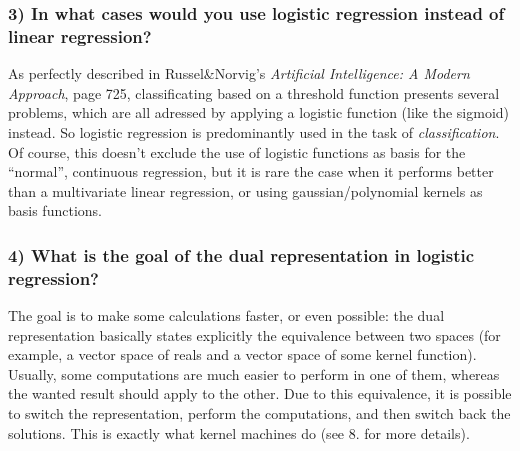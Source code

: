 \documentclass[11pt]{scrartcl} %
\begin{document}
         \subsubsection*{3) In what cases would you use logistic regression instead of linear regression?}
         As perfectly described in Russel\&Norvig's {\it Artificial Intelligence: A Modern Approach}, page 725, classificating based on a threshold function presents several problems, which are all adressed by applying a logistic function (like the sigmoid) instead. So logistic regression is predominantly used in the task of {\it classification}. Of course, this doesn't exclude the use of logistic functions as basis for the ``normal'', continuous regression, but it is rare the case when it performs better than a multivariate linear regression, or using gaussian/polynomial kernels as basis functions.
         \subsubsection*{4) What is the goal of the dual representation in logistic regression?}
         The goal is to make some calculations faster, or even possible: the dual representation basically states explicitly the equivalence between two spaces (for example, a vector space of reals and a vector space of some kernel function). Usually, some computations are much easier to perform in one of them, whereas the wanted result should apply to the other. Due to this equivalence, it is possible to switch the representation, perform the computations, and then switch back the solutions. This is exactly what kernel machines do (see 8. for more details).
\end{document}
